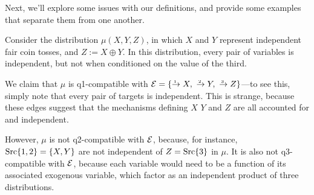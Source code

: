 \documentclass{article}
\begin{document}
    Next, we'll explore some issues with our definitions, and provide some examples that separate them from one another.
    
    \begin{example}
        Consider the distribution $\mu(X,Y,Z)$, in which $X$ and $Y$ represent independent fair coin tosses, and $Z := X \oplus Y$.
        In this distribution, every pair of variables is independent, but not when conditioned on the value of the third.
        
        We claim that $\mu$ is q1-compatible with $\Ed = \{ \ed1{}X, ~ \ed2{}Y, ~ \ed3{}Z \}$---to see this, simply note that every pair of targets is independent. This is strange, because these edges suggest that the mechanisms defining $X$ $Y$ and $Z$ are all accounted for and independent. 
        
        However, $\mu$ is not q2-compatible with $\mathcal E$, because, for instance,
        $\mathop{\mathrm{Src}} \{1,2\} = \{X,Y\}$ are not independent of $Z = \mathop{\mathrm{Src}} \{3\}$ in $\mu$.
        It is also not q3-compatible with $\mathcal E$, because each variable would need to be a function of its associated exogenous variable, which factor as an independent product of three distributions. 
    \end{example}
    
\end{document}
